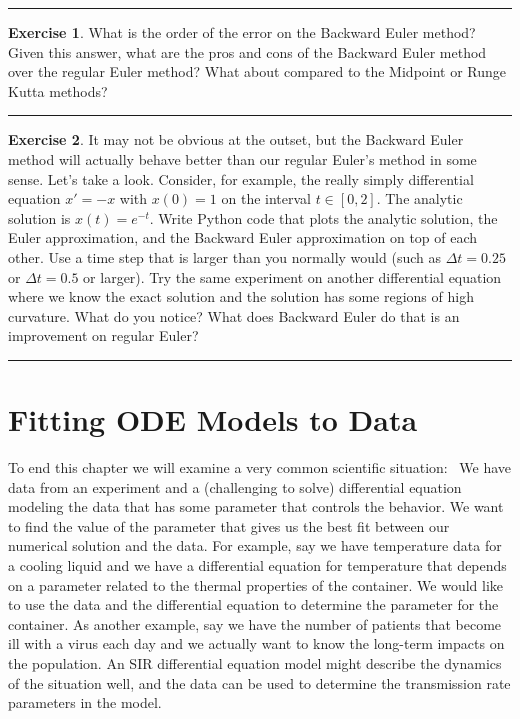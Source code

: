 \documentclass[
]{book}
\theoremstyle{definition}
\theoremstyle{definition}
\theoremstyle{definition}
\newtheorem{exercise}{Exercise}[chapter]
\theoremstyle{remark}
\begin{document}
\begin{center}\rule{0.5\linewidth}{0.5pt}\end{center}

\begin{exercise}
\protect\hypertarget{exr:unnamed-chunk-476}{}{\label{exr:unnamed-chunk-476} }What is the order of the error on the Backward Euler method? Given this answer, what are the pros and cons of the Backward Euler method over the regular Euler method? What about compared to the Midpoint or Runge Kutta methods?
\end{exercise}

\begin{center}\rule{0.5\linewidth}{0.5pt}\end{center}

\begin{exercise}
\protect\hypertarget{exr:unnamed-chunk-477}{}{\label{exr:unnamed-chunk-477} }It may not be obvious at the outset, but the Backward Euler method will actually behave better than our regular Euler's method in some sense. Let's take a look. Consider, for example, the really simply differential equation \(x' = -x\) with \(x(0) = 1\) on the interval \(t \in [0,2]\). The analytic solution is \(x(t) = e^{-t}\). Write Python code that plots the analytic solution, the Euler approximation, and the Backward Euler approximation on top of each other. Use a time step that is larger than you normally would (such as \(\Delta t = 0.25\) or \(\Delta t = 0.5\) or larger). Try the same experiment on another differential equation where we know the exact solution and the solution has some regions of high curvature. What do you notice? What does Backward Euler do that is an improvement on regular Euler?
\end{exercise}

\begin{center}\rule{0.5\linewidth}{0.5pt}\end{center}

\hypertarget{fitting-ode-models-to-data}{%
\section{Fitting ODE Models to Data}\label{fitting-ode-models-to-data}}

To end this chapter we will examine a very common scientific situation:~ We have data from an experiment and a (challenging to solve) differential equation modeling the data that has some parameter that controls the behavior. We want to find the value of the parameter that gives us the best fit between our numerical solution and the data. For example, say we have temperature data for a cooling liquid and we have a differential equation for temperature that depends on a parameter related to the thermal properties of the container. We would like to use the data and the differential equation to determine the parameter for the container. As another example, say we have the number of patients that become ill with a virus each day and we actually want to know the long-term impacts on the population. An SIR differential equation model might describe the dynamics of the situation well, and the data can be used to determine the transmission rate parameters in the model.
\end{document}
